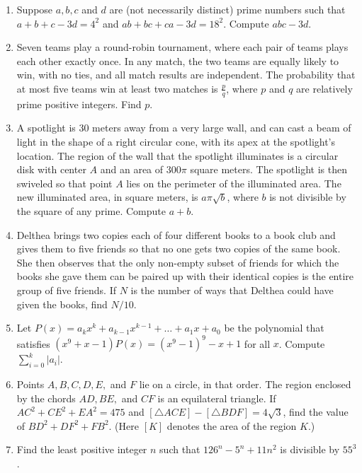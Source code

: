 \documentclass{article}
\begin{document}
\begin{enumerate}
\item Suppose $a,b,c$ and $d$ are (not necessarily distinct) prime numbers such that $a+b+c-3d=4^2$ and $ab+bc+ca-3d=18^2$. Compute $abc-3d$.

\item Seven teams play a round-robin tournament, where each pair of teams plays each other exactly once. In any match, the two teams are equally likely to win, with no ties, and all match results are independent. The probability that at most five teams win at least two matches is $\frac{p}{q}$, where $p$ and $q$ are relatively prime positive integers. Find $p$.

\item A spotlight is 30 meters away from a very large wall, and can cast a beam of light in the shape of a right circular cone, with its apex at the spotlight's location. The region of the wall that the spotlight illuminates is a circular disk with center $A$ and an area of $300\pi$ square meters. The spotlight is then swiveled so that point $A$ lies on the perimeter of the illuminated area. The new illuminated area, in square meters, is $a\pi \sqrt{b}$, where $b$ is not divisible by the square of any prime. Compute $a+b$.

\item Delthea brings two copies each of four different books to a book club and gives them to five friends so that no one gets two copies of the same book. She then observes that the only non-empty subset of friends for which the books she gave them can be paired up with their identical copies is the entire group of five friends. If $N$ is the number of ways that Delthea could have given the books, find $N/10$.

\item Let $P(x) = a_kx^k + a_{k-1}x^{k-1} + \ldots + a_1x + a_0$ be the polynomial that satisfies $(x^9+x-1)P(x) = (x^9-1)^9-x+1$ for all $x$. Compute $\displaystyle \sum_{i=0}^k |a_i|$.

\item Points $A,B,C,D,E,$ and $F$ lie on a circle, in that order. The region enclosed by the chords $AD, BE,$ and $CF$ is an equilateral triangle. If $AC^2+CE^2+EA^2=475$ and $[\triangle ACE]-[\triangle BDF]=4\sqrt{3}$, find the value of $BD^2+DF^2+FB^2$. (Here $[K]$ denotes the area of the region $K$.)

\item Find the least positive integer $n$ such that $126^n-5^n+11n^2$ is divisible by $55^3$.


\end{enumerate}
\end{document}
